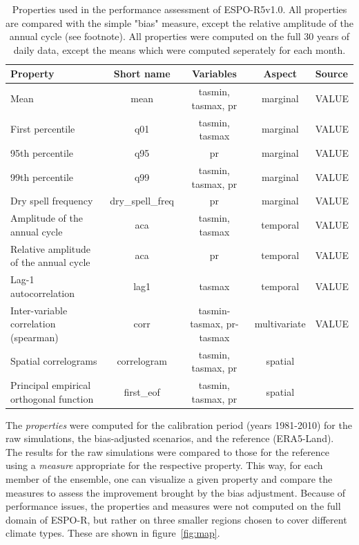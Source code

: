 \documentclass[letterpaper,10pt]{article}
\begin{document}
\begin{table}[!ht]
    \centering
    \caption{Properties used in the performance assessment of ESPO-R5v1.0. All properties are compared with the simple "bias" measure, except the relative amplitude of the annual cycle (see footnote). All properties were computed on the full 30 years of daily data, except the means which were computed seperately for each month.}
    \begin{tabular}{l|c|c|c|l}
    \hline
    Property                               & Short name & Variables          & Aspect   & Source \\ \hline
    Mean                                   & mean       & tasmin, tasmax, pr & marginal & VALUE \\ \hline
    First percentile                       & q01        & tasmin, tasmax     & marginal & VALUE \\ \hline
    95th percentile                        & q95        & pr                 & marginal & VALUE \\ \hline
    99th percentile                        & q99        & tasmin, tasmax, pr & marginal & VALUE \\ \hline
    Dry spell frequency                    & dry\_spell\_freq & pr           & marginal & VALUE \\ \hline
    Amplitude of the annual cycle          & aca        & tasmin, tasmax     & temporal & VALUE \\ \hline
    Relative amplitude of the annual cycle & aca        & pr                 & temporal & VALUE \\ \hline
    Lag-1 autocorrelation                  & lag1       & tasmax             & temporal & VALUE \\ \hline
    Inter-variable correlation (spearman)  & corr       & tasmin-tasmax, pr-tasmax & multivariate & VALUE \\ \hline
    Spatial correlograms                   & correlogram & tasmin, tasmax, pr & spatial & \cite{Francois2020} \\\hline
    Principal empirical orthogonal function& first\_eof & tasmin, tasmax, pr & spatial & \cite{Vrac2018} \\ \hline
    \end{tabular}
    \label{tab:props}

\end{table}

The \emph{properties} were computed for the calibration period (years 1981-2010) for the raw simulations, the bias-adjusted scenarios, and the reference (ERA5-Land).
The results for the raw simulations were compared to those for the reference using a \emph{measure} appropriate for the respective property. This way, for each member of the ensemble, one can visualize a given property and compare the measures to assess the improvement brought by the bias adjustment. Because of performance issues, the properties and measures were not computed on the full domain of ESPO-R, but rather on three smaller regions chosen to cover different climate types. These are shown in figure~\ref{fig:map}.
\end{document}
